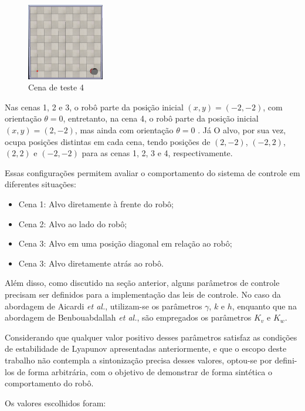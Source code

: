 \documentclass[conference]{IEEEtran}
\begin{document}
\begin{figure}[h!]
    \centering
    \includegraphics[width=0.3\textwidth]{Figuras/Cena_teste_4.png}
    \caption{Cena de teste 4}
    \label{fig:Cena_teste_4}
\end{figure}

Nas cenas 1, 2 e 3, o robô parte da posição inicial $(x, y) = (-2, -2)$, com orientação $\theta = 0$, entretanto, na cena 4, o robô parte da posição inicial $(x, y) = (2, -2)$, mas ainda com orientação $\theta = 0$ . Já O alvo, por sua vez, ocupa posições distintas em cada cena, tendo posições de $(2, -2)$, $(-2, 2)$, $(2, 2)$ e $(-2, -2)$ para as cenas 1, 2, 3 e 4, respectivamente.

Essas configurações permitem avaliar o comportamento do sistema de controle em diferentes situações:

\begin{itemize}
    \item Cena 1: Alvo diretamente à frente do robô;
    \item Cena 2: Alvo ao lado do robô;
    \item Cena 3: Alvo em uma posição diagonal em relação ao robô;
    \item Cena 3: Alvo diretamente atrás ao robô.
\end{itemize}

Além disso, como discutido na seção anterior, alguns parâmetros de controle precisam ser definidos para a implementação das leis de controle. No caso da abordagem de Aicardi \textit{et al.}, utilizam-se os parâmetros $\gamma$, $k$ e $h$, enquanto que na abordagem de Benbouabdallah \textit{et al.}, são empregados os parâmetros $K_v$ e $K_w$.

Considerando que qualquer valor positivo desses parâmetros satisfaz as condições de estabilidade de Lyapunov apresentadas anteriormente, e que o escopo deste trabalho não contempla a sintonização precisa desses valores, optou-se por defini-los de forma arbitrária, com o objetivo de demonstrar de forma sintética o comportamento do robô.

Os valores escolhidos foram:
\end{document}
